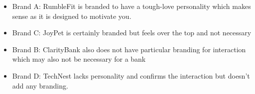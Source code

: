 \documentclass[12pt]{article}
\begin{document}

\begin{itemize}
    \item Brand A: RumbleFit is branded to have a tough-love personality which makes sense as it is designed to motivate you.
    \item Brand C: JoyPet is certainly branded but feels over the top and not necessary
    \item Brand B: ClarityBank also does not have particular branding for interaction which may also not be necessary for a bank
    \item Brand D: TechNest lacks personality and confirms the interaction but doesn't add any branding.
\end{itemize}
\end{document}
